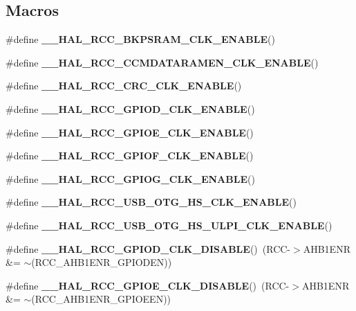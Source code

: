 \subsection*{Macros}
\begin{DoxyCompactItemize}
\item 
\#define {\bfseries \+\_\+\+\_\+\+H\+A\+L\+\_\+\+R\+C\+C\+\_\+\+B\+K\+P\+S\+R\+A\+M\+\_\+\+C\+L\+K\+\_\+\+E\+N\+A\+B\+LE}()
\item 
\#define {\bfseries \+\_\+\+\_\+\+H\+A\+L\+\_\+\+R\+C\+C\+\_\+\+C\+C\+M\+D\+A\+T\+A\+R\+A\+M\+E\+N\+\_\+\+C\+L\+K\+\_\+\+E\+N\+A\+B\+LE}()
\item 
\#define {\bfseries \+\_\+\+\_\+\+H\+A\+L\+\_\+\+R\+C\+C\+\_\+\+C\+R\+C\+\_\+\+C\+L\+K\+\_\+\+E\+N\+A\+B\+LE}()
\item 
\#define {\bfseries \+\_\+\+\_\+\+H\+A\+L\+\_\+\+R\+C\+C\+\_\+\+G\+P\+I\+O\+D\+\_\+\+C\+L\+K\+\_\+\+E\+N\+A\+B\+LE}()
\item 
\#define {\bfseries \+\_\+\+\_\+\+H\+A\+L\+\_\+\+R\+C\+C\+\_\+\+G\+P\+I\+O\+E\+\_\+\+C\+L\+K\+\_\+\+E\+N\+A\+B\+LE}()
\item 
\#define {\bfseries \+\_\+\+\_\+\+H\+A\+L\+\_\+\+R\+C\+C\+\_\+\+G\+P\+I\+O\+F\+\_\+\+C\+L\+K\+\_\+\+E\+N\+A\+B\+LE}()
\item 
\#define {\bfseries \+\_\+\+\_\+\+H\+A\+L\+\_\+\+R\+C\+C\+\_\+\+G\+P\+I\+O\+G\+\_\+\+C\+L\+K\+\_\+\+E\+N\+A\+B\+LE}()
\item 
\#define {\bfseries \+\_\+\+\_\+\+H\+A\+L\+\_\+\+R\+C\+C\+\_\+\+U\+S\+B\+\_\+\+O\+T\+G\+\_\+\+H\+S\+\_\+\+C\+L\+K\+\_\+\+E\+N\+A\+B\+LE}()
\item 
\#define {\bfseries \+\_\+\+\_\+\+H\+A\+L\+\_\+\+R\+C\+C\+\_\+\+U\+S\+B\+\_\+\+O\+T\+G\+\_\+\+H\+S\+\_\+\+U\+L\+P\+I\+\_\+\+C\+L\+K\+\_\+\+E\+N\+A\+B\+LE}()
\item 
\#define {\bfseries \+\_\+\+\_\+\+H\+A\+L\+\_\+\+R\+C\+C\+\_\+\+G\+P\+I\+O\+D\+\_\+\+C\+L\+K\+\_\+\+D\+I\+S\+A\+B\+LE}()~(R\+CC-\/$>$A\+H\+B1\+E\+NR \&= $\sim$(R\+C\+C\+\_\+\+A\+H\+B1\+E\+N\+R\+\_\+\+G\+P\+I\+O\+D\+EN))\hypertarget{group___r_c_c_ex___exported___macros_gaeaefe364dafdc0c22353969595421422}{}\label{group___r_c_c_ex___exported___macros_gaeaefe364dafdc0c22353969595421422}

\item 
\#define {\bfseries \+\_\+\+\_\+\+H\+A\+L\+\_\+\+R\+C\+C\+\_\+\+G\+P\+I\+O\+E\+\_\+\+C\+L\+K\+\_\+\+D\+I\+S\+A\+B\+LE}()~(R\+CC-\/$>$A\+H\+B1\+E\+NR \&= $\sim$(R\+C\+C\+\_\+\+A\+H\+B1\+E\+N\+R\+\_\+\+G\+P\+I\+O\+E\+EN))\hypertarget{group___r_c_c_ex___exported___macros_gad8982750e98b22493ae0677b3021b01b}{}\label{group___r_c_c_ex___exported___macros_gad8982750e98b22493ae0677b3021b01b}


\end{DoxyCompactItemize}
